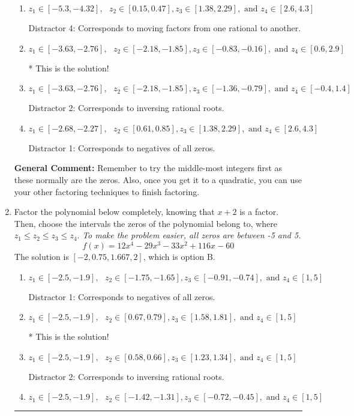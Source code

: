 \documentclass{extbook}[14pt]
\newcommand{\litem}[1]{\item #1

\rule{\textwidth}{0.4pt}}
\begin{document}
\begin{enumerate}
{\begin{enumerate}[label=\Alph*.]
 Distractor 3: Corresponds to negatives of all zeros AND inversing rational roots.
\item \( z_1 \in [-5.3, -4.32], \text{   }  z_2 \in [0.15, 0.47], z_3 \in [1.38, 2.29], \text{   and   } z_4 \in [2.6, 4.3] \)

 Distractor 4: Corresponds to moving factors from one rational to another.
\item \( z_1 \in [-3.63, -2.76], \text{   }  z_2 \in [-2.18, -1.85], z_3 \in [-0.83, -0.16], \text{   and   } z_4 \in [0.6, 2.9] \)

* This is the solution!
\item \( z_1 \in [-3.63, -2.76], \text{   }  z_2 \in [-2.18, -1.85], z_3 \in [-1.36, -0.79], \text{   and   } z_4 \in [-0.4, 1.4] \)

 Distractor 2: Corresponds to inversing rational roots.
\item \( z_1 \in [-2.68, -2.27], \text{   }  z_2 \in [0.61, 0.85], z_3 \in [1.38, 2.29], \text{   and   } z_4 \in [2.6, 4.3] \)

 Distractor 1: Corresponds to negatives of all zeros.
\end{enumerate}

\textbf{General Comment:} Remember to try the middle-most integers first as these normally are the zeros. Also, once you get it to a quadratic, you can use your other factoring techniques to finish factoring.
}
\litem{
Factor the polynomial below completely, knowing that $x + 2$ is a factor. Then, choose the intervals the zeros of the polynomial belong to, where $z_1 \leq z_2 \leq z_3 \leq z_4$. \textit{To make the problem easier, all zeros are between -5 and 5.}
\[ f(x) = 12x^{4} -29 x^{3} -33 x^{2} +116 x -60 \]The solution is \( [-2, 0.75, 1.667, 2] \), which is option B.\begin{enumerate}[label=\Alph*.]
\item \( z_1 \in [-2.5, -1.9], \text{   }  z_2 \in [-1.75, -1.65], z_3 \in [-0.91, -0.74], \text{   and   } z_4 \in [1, 5] \)

 Distractor 1: Corresponds to negatives of all zeros.
\item \( z_1 \in [-2.5, -1.9], \text{   }  z_2 \in [0.67, 0.79], z_3 \in [1.58, 1.81], \text{   and   } z_4 \in [1, 5] \)

* This is the solution!
\item \( z_1 \in [-2.5, -1.9], \text{   }  z_2 \in [0.58, 0.66], z_3 \in [1.23, 1.34], \text{   and   } z_4 \in [1, 5] \)

 Distractor 2: Corresponds to inversing rational roots.
\item \( z_1 \in [-2.5, -1.9], \text{   }  z_2 \in [-1.42, -1.31], z_3 \in [-0.72, -0.45], \text{   and   } z_4 \in [1, 5] \)


\end{enumerate}}
\end{enumerate}
\end{document}
